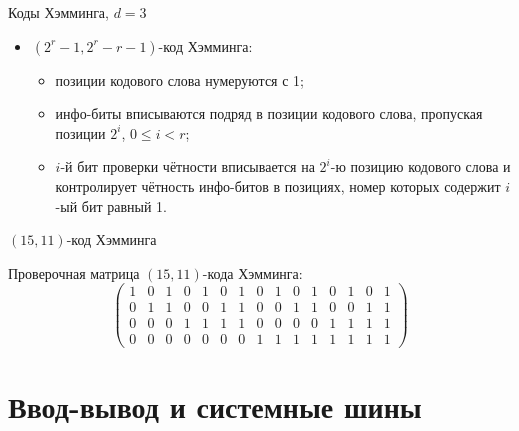 \begin{frame}{Коды Хэмминга, $d=3$}
\begin{itemize}[<+->]
    \item $(2^r - 1, 2^r - r - 1)$-код Хэмминга: \\
    \begin{itemize}
        \item позиции кодового слова нумеруются с 1;

        \item инфо-биты вписываются подряд в позиции
            кодового слова, пропуская позиции $2^i$, $0 \leqslant i < r$;

        \item $i$-й бит проверки чётности вписывается на $2^i$-ю
            позицию кодового слова и контролирует чётность инфо-битов
            в позициях, номер которых содержит $i$-ый бит равный 1.
    \end{itemize}
\end{itemize}
\end{frame}

\begin{frame}{$(15,11)$-код Хэмминга}

\pause
Проверочная матрица $(15,11)$-кода Хэмминга:
\[
\left( \begin{array}{ccccccccccccccc}
1 & 0 & 1 & 0 & 1 & 0 &1 & 0 &1 & 0 &1 & 0 &1 & 0 &1 \\
0 & 1 & 1 & 0 &0 & 1 & 1 & 0 &0 & 1 & 1 & 0 &0 & 1 & 1\\
0 & 0 & 0 & 1 &1 & 1 & 1 & 0 & 0 & 0 & 0 & 1 &1 & 1 & 1\\
0 & 0 & 0 & 0 &0 & 0 & 0 & 1 &1 & 1 & 1 & 1 &1 & 1 & 1
\end{array} \right)
\]
\end{frame}

\section{Ввод-вывод и системные шины}


